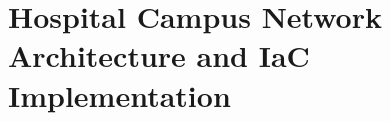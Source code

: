 \section{Hospital Campus Network Architecture and IaC Implementation}
\label{sec:campus_iac_design}
